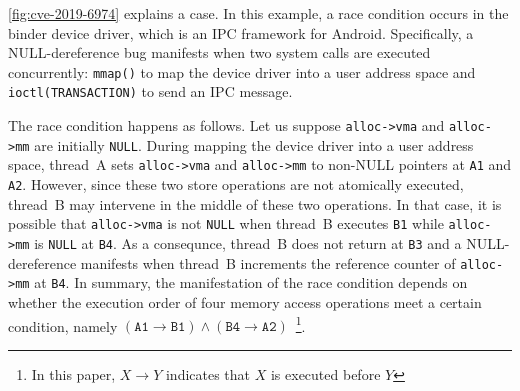 \autoref{fig:cve-2019-6974} explains a case. In this example, a race
condition occurs in the binder device driver, which is an IPC
framework for Android. Specifically, a NULL-dereference bug manifests
when two system calls are executed concurrently: \texttt{mmap()} to
map the device driver into a user address space and
\texttt{ioctl(TRANSACTION)} to send an IPC message.


The race condition happens as follows. Let us suppose
\texttt{alloc->vma} and \texttt{alloc->mm} are initially
\texttt{NULL}.
%
During mapping the device driver into a user address space, thread~A
sets \texttt{alloc->vma} and \texttt{alloc->mm} to non-NULL pointers
at \texttt{A1} and \texttt{A2}.
%
However, since these two store operations are not atomically executed,
thread~B may intervene in the middle of these two operations.
%
In that case, it is possible that \texttt{alloc->vma} is not
\texttt{NULL} when thread~B executes \texttt{B1} while
\texttt{alloc->mm} is \texttt{NULL} at \texttt{B4}.
%
As a consequnce, thread~B does not return at \texttt{B3} and a
NULL-dereference manifests when thread~B increments the reference
counter of \texttt{alloc->mm} at \texttt{B4}.
%
In summary, the manifestation of the race condition depends on whether
the execution order of four memory access operations meet a certain
condition, namely
$(\texttt{A1} \rightarrow \texttt{B1}) \wedge (\texttt{B4} \rightarrow
\texttt{A2})$~\footnote{In this paper, $X \rightarrow Y$ indicates
  that $X$ is executed before $Y$}.







